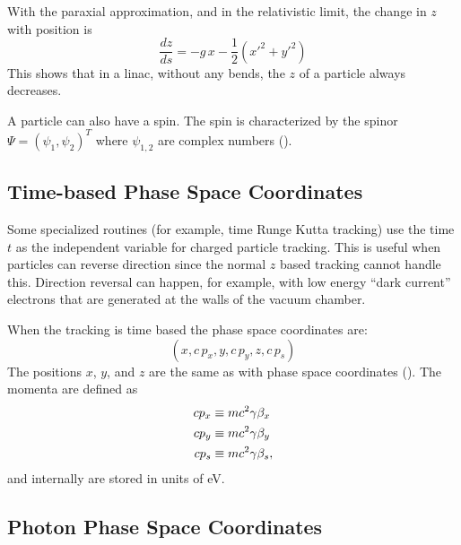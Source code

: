 With the paraxial approximation, and in the relativistic limit, the change in $z$ with position is
\begin{equation}
  \frac{dz}{ds} = -g \, x - \frac{1}{2} (x'^2 + y'^2)
\end{equation}
This shows that in a linac, without any bends, the $z$ of a particle always decreases.

A particle can also have a spin. The spin is characterized by the spinor $\Psi = \left( \psi_{1},
\psi_{2} \right)^{T}$ where $\psi_{1,2}$ are complex numbers ().

\subsection{Time-based Phase Space Coordinates}
\label{s:time.phase.space}

Some specialized routines (for example, time Runge Kutta tracking) use the time $t$ as the
independent variable for charged particle tracking. This is useful when particles can reverse
direction since the normal $z$ based tracking cannot handle this. Direction reversal can happen, for
example, with low energy ``dark current'' electrons that are generated at the walls of the vacuum
chamber.

When the tracking is time based the phase space coordinates are:
\begin{equation}
  (x, c \, p_x, y, c \, p_y, z, c \, p_s)
\end{equation}
The positions $x$, $y$, and $z$ are the same as with phase space coordinates
(). The momenta are defined as
\begin{align}
c p_x &\equiv m c^2 \gamma \beta_x \nonumber \\
c p_y &\equiv m c^2 \gamma \beta_y \\
c p_s &\equiv m c^2 \gamma \beta_s, \nonumber
\end{align}
and internally are stored in units of eV.

\subsection{Photon Phase Space Coordinates}
\label{s:photon.phase.space}

